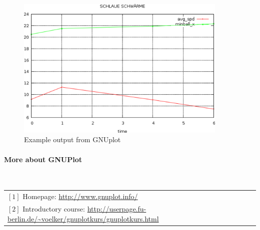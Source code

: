 \begin{figure}
	\includegraphics[width=0.9\textwidth]{stats-howto-gnuplot.png}
	\caption{Example output from GNUplot}
\end{figure}


\paragraph{More about GNUPlot}~\\

\begin{tabular}{l}
 $[1]$ Homepage: \url{http://www.gnuplot.info/} \\
 $[2]$ Introductory course: \url{http://userpage.fu-berlin.de/~voelker/gnuplotkurs/gnuplotkurs.html}
\end{tabular}